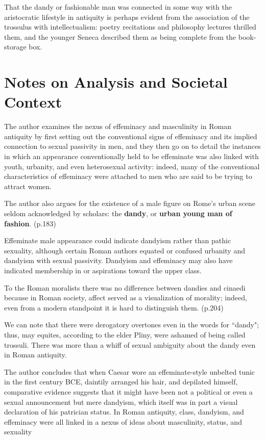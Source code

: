 That the dandy or fashionable man was connected in some way with the aristocratic lifestyle in antiquity is perhaps evident from the association of the trossulus with intellectualism: poetry recitations and philosophy lectures thrilled them, and the younger Seneca described them as being complete from the book-storage box. 


\section{Notes on Analysis and Societal Context}
\label{sec:SocCont12}

The author examines the nexus of effeminacy and masculinity in Roman antiquity by first setting out the conventional signs of effeminacy and its implied connection to sexual passivity in men, and they then go on to detail the instances in which an appearance conventionally held to be effeminate was also linked with youth, urbanity, and even heterosexual activity: indeed, many of the conventional characteristics of effeminacy were attached to men who are said to be trying to attract women.

The author also argues for the existence of a male figure on Rome's urban scene seldom acknowledged by scholars: the \textbf{dandy}, or \textbf{urban young man of fashion}. (p.183)



Effeminate male appearance could indicate dandyism rather than pathic sexuality, although certain Roman authors equated or confused urbanity and dandyism with sexual passivity. Dandyism and effeminacy may also have indicated membership in or aspirations toward the upper class.

To the Roman moralists there was no difference between dandies and cinaedi because in Roman society, affect served as a visualization of morality; indeed, even from a modern standpoint it is hard to distinguish them. (p.204)

We can note that there were derogatory overtones even in the words for ``dandy"; thus, may equites, according to the elder Pliny, were ashamed of being called trossuli. There was more than a whiff of sexual ambiguity about the dandy even in Roman antiquity.

The author concludes that when Caesar wore an effeminate-style unbelted tunic in the first century BCE, daintily arranged his hair, and depilated himself, comparative evidence suggests that it might have been not a political or even a sexual announcement but mere dandyism, which itself was in part a visual declaration of his patrician status. In Roman antiquity, class, dandyism, and effeminacy were all linked in a nexus of ideas about masculinity, status, and sexuality




